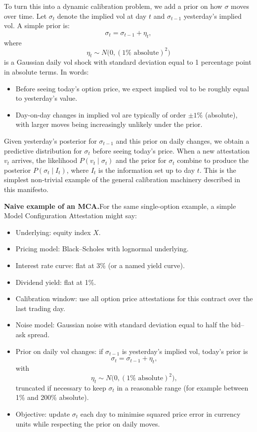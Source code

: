 \documentclass[11pt,a4paper]{article}
\begin{document}
To turn this into a dynamic calibration problem, we add a prior on how $\sigma$ moves over time. Let $\sigma_t$ denote the implied vol at day $t$ and $\sigma_{t-1}$ yesterday's implied vol. A simple prior is:
\[
    \sigma_t = \sigma_{t-1} + \eta_t,
\]
where
\[
    \eta_t \sim N\bigl(0, (1\%\text{ absolute})^2\bigr)
\]
is a Gaussian daily vol shock with standard deviation equal to 1 percentage point in absolute terms. In words:
\begin{itemize}
    \item Before seeing today's option price, we expect implied vol to be roughly equal to yesterday's value.
    \item Day-on-day changes in implied vol are typically of order $\pm 1\%$ (absolute), with larger moves being increasingly unlikely under the prior.
\end{itemize}

Given yesterday's posterior for $\sigma_{t-1}$ and this prior on daily changes, we obtain a predictive distribution for $\sigma_t$ before seeing today's price. When a new attestation $v_t$ arrives, the likelihood $P(v_t \mid \sigma_t)$ and the prior for $\sigma_t$ combine to produce the posterior $P(\sigma_t \mid I_t)$, where $I_t$ is the information set up to day $t$. This is the simplest non-trivial example of the general calibration machinery described in this manifesto.

\textbf{Naive example of an MCA.}\quad For the same single-option example, a simple Model Configuration Attestation might say:
\begin{itemize}
    \item Underlying: equity index $X$.
    \item Pricing model: Black--Scholes with lognormal underlying.
    \item Interest rate curve: flat at 3\% (or a named yield curve).
    \item Dividend yield: flat at 1\%.
    \item Calibration window: use all option price attestations for this contract over the last trading day.
    \item Noise model: Gaussian noise with standard deviation equal to half the bid--ask spread.
    \item Prior on daily vol changes: if $\sigma_{t-1}$ is yesterday's implied vol, today's prior is
    \[
        \sigma_t = \sigma_{t-1} + \eta_t,
    \]
    with
    \[
        \eta_t \sim N\bigl(0, (1\%\text{ absolute})^2\bigr),
    \]
    truncated if necessary to keep $\sigma_t$ in a reasonable range (for example between 1\% and 200\% absolute).
    \item Objective: update $\sigma_t$ each day to minimise squared price error in currency units while respecting the prior on daily moves.
\end{itemize}
\end{document}
